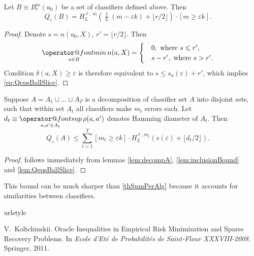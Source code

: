 \documentclass{article}
\makeatletter
\renewcommand{\geq}{\geqslant}
\renewcommand{\leq}{\leqslant}
\renewcommand{\epsilon}{\varepsilon}\newcommand{\eps}{\varepsilon}
\renewcommand{\min}{\mathop{\operator@font min}\limits}
\renewcommand{\sup}{\mathop{\operator@font sup}\limits}
\newcommand{\hypergeom}[5]{{#1}_{#2}^{#4,\:#3}\left(#5\right)}
\newcommand{\Hyper}[4]{\hypergeom{H}{#1}{#2}{#3}{#4}}
\renewcommand{\emph}[1]{\textit{#1}}
\makeatother
\begin{document}
\begin{lemma}
\label{lem:QepsBallSlice}
Let $B \equiv B_r^m(a_0)$ be a set of classifiers defined above. Then
\begin{equation}
\label{eq:QepsBallSlice}
Q_\eps(B) = \Hyper{L}{m}{\ell}{\tfrac\ell L (m - \eps k) + \lfloor r / 2 \rfloor} \cdot [m \geq \eps k].
\end{equation}
\end{lemma}
\begin{proof}
Denote $s = n(a_0, X)$, $r' = \lfloor r / 2 \rfloor$. Then
\[
    \min_{a \in B} n(a, X) =
    \begin{cases}
        & 0, \text{ where } s \leq r', \\
        & s - r', \text{ where } s > r'.
    \end{cases}
\]
Condition $\delta(a, X) \geq \eps$ is therefore equivalent to $s \leq s_a(\eps) + r'$, which implies \eqref{eq:QepsBallSlice}.
\end{proof}

\begin{theorem}
Suppose $A = A_1 \sqcup \dots \sqcup A_T$ is a decomposition of classifier set $A$ into disjoint sets,
such that within set $A_t$ all classifiers make $m_t$ errors each.
Let $d_t \equiv \sup_{a, a' \in A_t} \rho(a, a')$ denotes Hamming diameter of $A_t$. Then
\begin{equation}
    Q_\eps(A) \leq \sum_{t = 1}^T [m_t \geq \eps k] \cdot H_L^{\ell, m_t}(s(\epsilon) + \big\lfloor d_t/2 \big\rfloor).
\end{equation}
\end{theorem}
\begin{proof} follows immediately from lemmas \ref{lem:decompA}, \ref{lem:inclusionBound} and \ref{lem:QepsBallSlice}. \end{proof}

This bound can be much sharper than \eqref{thSumPerAlg} because it accounts for similarities between classifiers.

%

\begin{thebibliography}{27}
\providecommand{\natexlab}[1]{#1}
\providecommand{\url}[1]{\texttt{#1}}
\expandafter\ifx\csname urlstyle\endcsname\relax
  \providecommand{\doi}[1]{doi: #1}\else
  \providecommand{\doi}{doi: \begingroup \urlstyle{rm}\Url}\fi

    V.~Koltchinskii.
    \newblock Oracle Inequalities in Empirical Risk Minimization and Sparse Recovery Problems.
    \newblock In \emph{Ecole d'Et\'e de Probabilit\'es de Saint-Flour XXXVIII-2008.} Springer, 2011.

\end{thebibliography}
\end{document}
